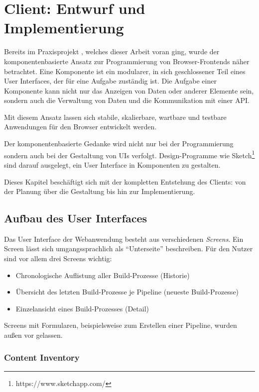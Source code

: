 \section{Client: Entwurf und Implementierung}

Bereits im Praxisprojekt \citep{Maemecke2017}, welches dieser Arbeit voran ging, wurde der komponentenbasierte Ansatz zur Programmierung von Browser-Frontends näher betrachtet. Eine Komponente ist ein modularer, in sich geschlossener Teil eines User Interfaces, der für eine Aufgabe zuständig ist. Die Aufgabe einer Komponente kann nicht nur das Anzeigen von Daten oder anderer Elemente sein, sondern auch die Verwaltung von Daten und die Kommunikation mit einer API.

Mit diesem Ansatz lassen sich stabile, skalierbare, wartbare und testbare Anwendungen für den Browser entwickelt werden.

Der komponentenbasierte Gedanke wird nicht nur bei der Programmierung sondern auch bei der Gestaltung von \acp{UI} verfolgt. Design-Programme wie Sketch\footnote{https://www.sketchapp.com/} sind darauf ausgelegt, ein User Interface in Komponenten zu gestalten.

Dieses Kapitel beschäftigt sich mit der kompletten Entstehung des Clients: von der Planung über die Gestaltung bis hin zur Implementierung.

\subsection{Aufbau des User Interfaces}
\label{subsec:entwurf-user-interface}

Das User Interface der Webanwendung besteht aus verschiedenen \emph{Screens}. Ein Screen lässt sich umgangssprachlich als ``Unterseite'' beschreiben. Für den Nutzer sind vor allem drei Screens wichtig:

\begin{itemize}
  \item Chronologische Auflistung aller Build-Prozesse (Historie)
  \item Übersicht des letzten Build-Prozesse je Pipeline (neueste Build-Prozesse)
  \item Einzelansicht eines Build-Prozesses (Detail)
\end{itemize}

Screens mit Formularen, beispielsweise zum Erstellen einer Pipeline, wurden außen vor gelassen.

\subsubsection{Content Inventory}

